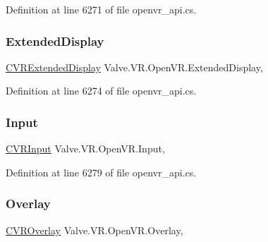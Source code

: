 Definition at line 6271 of file openvr\+\_\+api.\+cs.

\mbox{\label{class_valve_1_1_v_r_1_1_open_v_r_a227c90cd1dd0575cbaca0784a3d588ca}} 
\subsubsection{\texorpdfstring{ExtendedDisplay}{ExtendedDisplay}}
{\footnotesize\ttfamily \mbox{\hyperlink{class_valve_1_1_v_r_1_1_c_v_r_extended_display}{C\+V\+R\+Extended\+Display}} Valve.\+V\+R.\+Open\+V\+R.\+Extended\+Display\hspace{0.3cm}{\ttfamily [static]}, {\ttfamily [get]}}



Definition at line 6274 of file openvr\+\_\+api.\+cs.

\mbox{\label{class_valve_1_1_v_r_1_1_open_v_r_a7654f626318585e535bbcdca6a2b01ec}} 
\subsubsection{\texorpdfstring{Input}{Input}}
{\footnotesize\ttfamily \mbox{\hyperlink{class_valve_1_1_v_r_1_1_c_v_r_input}{C\+V\+R\+Input}} Valve.\+V\+R.\+Open\+V\+R.\+Input\hspace{0.3cm}{\ttfamily [static]}, {\ttfamily [get]}}



Definition at line 6279 of file openvr\+\_\+api.\+cs.

\mbox{\label{class_valve_1_1_v_r_1_1_open_v_r_a03223e58125dbd40477879c4283728a3}} 
\subsubsection{\texorpdfstring{Overlay}{Overlay}}
{\footnotesize\ttfamily \mbox{\hyperlink{class_valve_1_1_v_r_1_1_c_v_r_overlay}{C\+V\+R\+Overlay}} Valve.\+V\+R.\+Open\+V\+R.\+Overlay\hspace{0.3cm}{\ttfamily [static]}, {\ttfamily [get]}}



